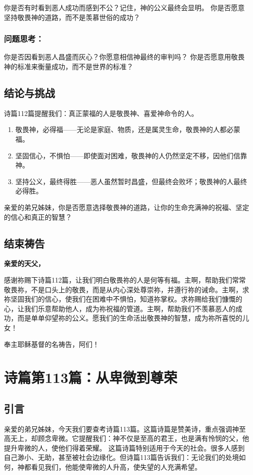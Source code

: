 \documentclass[a4paper, 12pt]{article}
\begin{document}
你是否有时看到恶人成功而感到不公？记住，神的公义最终会显明。
你是否愿意坚持敬畏神的道路，而不是羡慕世俗的成功？
\subsubsection*{问题思考：}

你是否因看到恶人昌盛而灰心？你愿意相信神最终的审判吗？
你是否愿意用敬畏神的标准来衡量成功，而不是世界的标准？
\subsection*{结论与挑战}
诗篇112篇提醒我们：真正蒙福的人是敬畏神、喜爱神命令的人。
\begin{enumerate}
    \item 敬畏神，必得福——无论是家庭、物质，还是属灵生命，敬畏神的人都必蒙福。

    \item 坚固信心，不惧怕——即使面对困难，敬畏神的人仍然坚定不移，因他们信靠神。

    \item 坚持公义，最终得胜——恶人虽然暂时昌盛，但最终会败坏；敬畏神的人最终必得胜。

\end{enumerate}

亲爱的弟兄姊妹，你是否愿意选择敬畏神的道路，让你的生命充满神的祝福、坚定的信心和真正的智慧？

\subsection*{结束祷告}
\textbf{亲爱的天父，}

感谢祢赐下诗篇112篇，让我们明白敬畏祢的人是何等有福。主啊，帮助我们常常敬畏祢，不是口头上的敬畏，而是从内心深处尊崇祢，并遵行祢的诫命。主啊，求祢坚固我们的信心，使我们在困难中不惧怕，知道祢掌权。求祢赐给我们慷慨的心，让我们乐意帮助他人，成为祢祝福的管道。主啊，帮助我们不羡慕恶人的成功，而是单单仰望祢的公义。愿我们的生命活出敬畏神的智慧，成为祢所喜悦的儿女！

奉主耶稣基督的名祷告，阿们！
\newpage
\section{诗篇第113篇：从卑微到尊荣}
\subsection*{引言}
亲爱的弟兄姊妹，今天我们要查考诗篇113篇。这篇诗篇是赞美诗，重点强调神至高无上，却顾念卑微。它提醒我们：神不仅是至高的君王，也是满有怜悯的父，他提升卑微的人，使他们得着荣耀。
这篇诗篇特别适用于今天的社会。很多人感到自己渺小、无助，甚至被社会边缘化。但诗篇113篇告诉我们：无论我们的处境如何，神都看见我们，他能使卑微的人升高，使失望的人充满希望。
\end{document}
